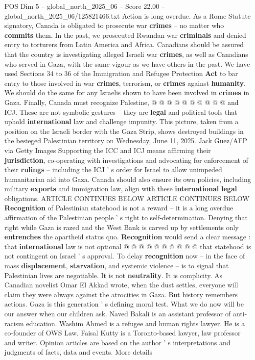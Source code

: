 \begin{textsample}{POS Dim 5 – global\_north\_2025\_06 – Score 22.00 – global\_north\_2025\_06/125821466.txt}
Action is long overdue.
As a Rome Statute signatory, Canada is obligated to prosecute war \textbf{crimes} -- no matter who \textbf{commits} them.
In the past, we prosecuted Rwandan war \textbf{criminals} and denied entry to torturers from Latin America and Africa.
Canadians should be assured that the country is investigating alleged Israeli war \textbf{crimes}, as well as Canadians who served in Gaza, with the same vigour as we have others in the past.
We have used Sections 34 to 36 of the Immigration and Refugee Protection \textbf{Act} to bar entry to those involved in war \textbf{crimes}, terrorism, or \textbf{crimes} against \textbf{humanity}.
We should do the same for any Israelis shown to have been involved in \textbf{crimes} in Gaza.
Finally, Canada must recognize Palestine, @ @ @ @ @ @ @ @ @ @ and ICJ.
These are not symbolic gestures -- they are \textbf{legal} and political tools that uphold \textbf{international} law and challenge impunity.
This picture, taken from a position on the Israeli border with the Gaza Strip, shows destroyed buildings in the besieged Palestinian territory on Wednesday, June 11, 2025.
Jack Guez/AFP via Getty Images Supporting the ICC and ICJ means affirming their \textbf{jurisdiction}, co-operating with investigations and advocating for enforcement of their \textbf{rulings} -- including the ICJ ' s order for Israel to allow unimpeded humanitarian aid into Gaza.
Canada should also ensure its own policies, including military \textbf{exports} and immigration law, align with these \textbf{international} \textbf{legal} obligations.
ARTICLE CONTINUES BELOW ARTICLE CONTINUES BELOW \textbf{Recognition} of Palestinian statehood is not a reward -- it is a long overdue affirmation of the Palestinian people ' s right to self-determination.
Denying that right while Gaza is razed and the West Bank is carved up by settlements only \textbf{entrenches} the apartheid status quo. \textbf{Recognition} would send a clear message : that \textbf{international} law is not optional @ @ @ @ @ @ @ @ @ @ that statehood is not contingent on Israel ' s approval.
To delay \textbf{recognition} now -- in the face of mass \textbf{displacement}, \textbf{starvation}, and systemic violence -- is to signal that Palestinian lives are negotiable.
It is not \textbf{neutrality}.
It is complicity.
As Canadian novelist Omar El Akkad wrote, when the dust settles, everyone will claim they were always against the atrocities in Gaza.
But history remembers actions.
Gaza is this generation ' s defining moral test.
What we do now will be our answer when our children ask.
Naved Bakali is an assistant professor of anti-racism education.
Washim Ahmed is a refugee and human rights lawyer.
He is a co-founder of OWS Law.
Faisal Kutty is a Toronto-based lawyer, law professor and writer.
Opinion articles are based on the author ' s interpretations and judgments of facts, data and events.
More details

\end{textsample}
